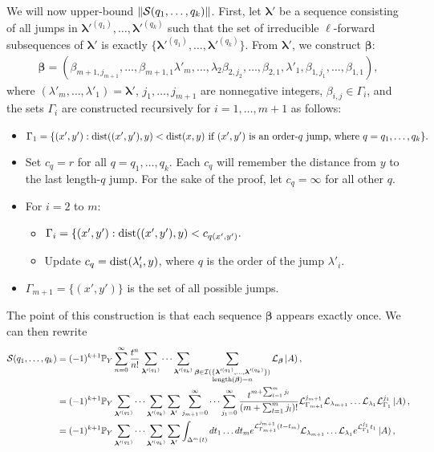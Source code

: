 We will now upper-bound $\left\|\mathcal S(q_1,\dots,q_k)\right\|$.
First, let $\bm \lambda'$ be a sequence consisting of all jumps in $\bm\lambda'^{(q_1)},\dots,\bm\lambda'^{(q_k)}$ such that the set of irreducible $\ell$-forward subsequences of $\bm \lambda'$ is exactly $\{\bm\lambda'^{(q_1)},\dots,\bm\lambda'^{(q_k)}\}$.
From $\bm\lambda'$, we construct $\bm \beta$: %
\begin{align}
	\bm \beta = \left(\beta_{m+1,j_{m+1}},\dots,\beta_{m+1,1}\lambda'_m,\dots,\lambda_2 \beta_{2,j_2},\dots,\beta_{2,1},\lambda'_1,\beta_{1,j_1},\dots,\beta_{1,1}\right),\label{eq:betamunu-power-law}
\end{align}
where $(\lambda'_m,\dots,\lambda'_1) = \bm \lambda'$, $j_1,\dots,j_{m+1}$ are nonnegative integers, $\beta_{i,j} \in \Gamma_i$, and the sets $\Gamma_i$ are constructed recursively for $i=1,\dots,m+1$ as follows:
\begin{itemize}
	\item $
	\Gamma_1 =  \{(x',y'):\textrm{dist}((x',y'),y)<\textrm{dist}(x,y) \text{ if } (x',y') \text{ is an order-$q$ jump, where $q = q_1,\dots,q_k$}\}.$
	\item Set $c_q = r$ for all $q = q_1,\dots,q_k$. Each $c_q$ will remember the distance from $y$ to the last length-$q$ jump.
	For the sake of the proof, let $c_q = \infty$ for all other $q$.
	\item For $i = 2$ to $m$:
	\begin{itemize}
	\item $\Gamma_i = \{(x',y'):\textrm{dist}((x',y'),y)<c_{q(x',y')}.$
	\item Update $c_q = \textrm{dist}(\lambda'_i,y)$, where $q$ is the order of the jump $\lambda'_i$.
	\end{itemize}
	\item $\Gamma_{m+1} = \{(x',y')\}$ is the set of all possible jumps.
\end{itemize}
The point of this construction is that each sequence $\bm \beta$ appears exactly once.
We can then rewrite
\begin{align}
\mathcal S(q_1,\dots,q_k)
&=(-1)^{k+1}\mathbb{P}_Y \sum_{n=0}^{\infty} \frac{t^n}{n!} \sum_{\bm \lambda'^{(q_1)}} \dots\sum_{\bm \lambda'^{(q_k)}}
\sum_{\substack{\bm\beta\in\mathcal I(\{\bm\lambda'^{(q_1)},\dots,\bm\lambda'^{(q_k)}\})\\
\text{length}(\bm\beta) = n
}}
\mathcal{L}_{\bm \beta} \left | A \right),\\
&=(-1)^{k+1}\mathbb{P}_Y  \sum_{\bm \lambda'^{(q_1)}} \dots\sum_{\bm \lambda'^{(q_k)}}
\sum_{\bm\lambda'}
\sum_{j_{m+1}=0}^\infty
\dots
\sum_{j_1=0}^\infty
\frac{t^{m+\sum_{l=1}^{m}{j_l}}}{(m+\sum_{l=1}^{m}{j_l})!}
\mathcal{L}_{\Gamma_{m+1}}^{j_{m+1}}\mathcal{L}_{\lambda_{m+1}}\dots\mathcal{L}_{\lambda_{1}}\mathcal{L}_{\Gamma_{1}}^{j_1} \left | A \right),\\
&=(-1)^{k+1}\mathbb{P}_Y  \sum_{\bm \lambda'^{(q_1)}} \dots\sum_{\bm \lambda'^{(q_k)}}
\sum_{\bm\lambda'}
\int_{\Delta^m(t)}dt_1\dots dt_m
e^{\mathcal{L}_{\Gamma_{m+1}}^{j_{m+1}}(t-t_m)}\mathcal{L}_{\lambda_{m+1}}\dots\mathcal{L}_{\lambda_{1}}e^{\mathcal{L}_{\Gamma_{1}}^{j_1}t_1} \left | A \right),
\end{align}
